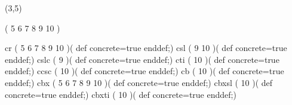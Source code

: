 %
%
%
%
%
%
%

\lhvercheck(3,5)

%
\MakeFileHeadstrue %
     \tablevalues                    ( 5 6 7 8 9 10              )

     \makefont \fonttwoletters cr    ( 5 6 7 8 9 10              )(%
                                                def concrete=true enddef;)
     \makefont \fonttwoletters csl   (         9 10              )(%
                                                def concrete=true enddef;)
     \makefont \fonttwoletters cslc  (         9                 )(%
                                                def concrete=true enddef;)
     \makefont \fonttwoletters cti   (           10              )(%
                                                def concrete=true enddef;)
     \makefont \fonttwoletters ccsc  (           10              )(%
                                                def concrete=true enddef;)
%
     \makefont \fonttwoletters cb    (           10              )(%
                                                def concrete=true enddef;)
     \makefont \fonttwoletters cbx   ( 5 6 7 8 9 10              )(%
                                                def concrete=true enddef;)
     \makefont \fonttwoletters cbxsl (           10              )(%
                                                def concrete=true enddef;)
     \makefont \fonttwoletters cbxti (           10              )(%
                                                def concrete=true enddef;)
\endinput
